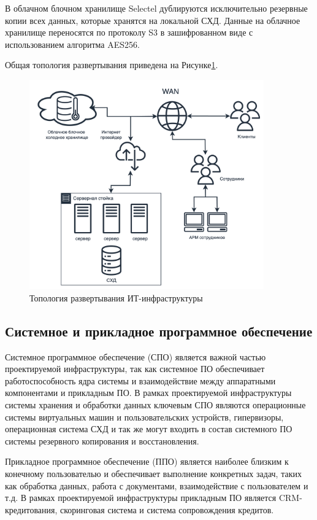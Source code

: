 \documentclass[14pt, a4paper]{extarticle}
\begin{document}
В облачном блочном хранилище Selectel дублируются исключительно резервные копии
всех данных, которые хранятся на локальной СХД. Данные на облачное хранилище переносятся
по протоколу S3 в зашифрованном виде с использованием алгоритма AES256.

Общая топология развертывания приведена на Рисунке\;\ref{fig:infra2}.

\begin{figure}[H]
  \centering
  \includegraphics[width=0.9\textwidth]{infra2_2.png}
  \caption{Топология развертывания ИТ-инфраструктуры}
  \label{fig:infra2}
\end{figure}

\subsection{Системное и прикладное программное обеспечение}

Системное программное обеспечение (СПО) является важной частью проектируемой инфраструктуры,
так как системное ПО обеспечивает работоспособность ядра системы и взаимодействие между
аппаратными компонентами и прикладным ПО. В рамках проектируемой инфраструктуры
системы хранения и обработки данных ключевым СПО являются операционные системы
виртуальных машин и пользовательских устройств, гипервизоры, операционная система СХД
и так же могут входить в состав системного ПО системы резервного копирования и восстановления.

Прикладное программное обеспечение (ППО) является наиболее близким к конечному пользователью
и обеспечивает выполнение конкретных задач, таких как обработка данных, работа с
документами, взаимодействие с пользователем и т.д. В рамках проектируемой инфраструктуры
прикладным ПО является CRM-кредитования, скоринговая система и система сопровождения кредитов.
\end{document}
